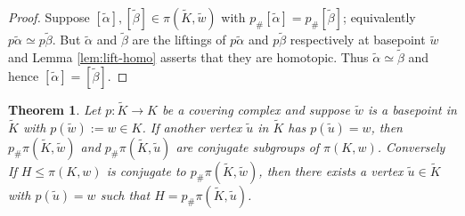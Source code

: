 \documentclass[12pt]{article}
\newtheorem{theorem}{Theorem}
\theoremstyle{definition}
\numberwithin{equation}{theorem}
\begin{document}
\begin{proof}
  Suppose $[\tilde{\alpha}],[\tilde{\beta}] \in \pi(\tilde{K},\tilde{w})$ with $p_{\#}[\tilde{\alpha}] = p_{\#}[\tilde{\beta}]$; equivalently $p\tilde{\alpha} \simeq p\tilde{\beta}$. But $\tilde{\alpha}$ and $\tilde{\beta}$ are the liftings of $p\tilde{\alpha}$ and $p\tilde{\beta}$ respectively at basepoint $\tilde{w}$ and Lemma \ref{lem:lift-homo} asserts that they are homotopic. Thus $\tilde{\alpha} \simeq \tilde{\beta}$ and hence $[\tilde{\alpha}] = [\tilde{\beta}]$.
\end{proof}

\begin{theorem}
  \label{thm:conj}
  Let $p: \tilde{K} \rightarrow K$ be a covering complex and suppose $\tilde{w}$ is a basepoint in $\tilde{K}$ with $p(\tilde{w}) := w \in K$. If another vertex $\tilde{u}$ in $\tilde{K}$ has $p(\tilde{u}) = w$, then $p_{\#}\pi(\tilde{K},\tilde{w})$ and $p_{\#}\pi(\tilde{K},\tilde{u})$ are conjugate subgroups of $\pi(K,w)$. Conversely If $H \leq \pi(K,w)$ is conjugate to $p_{\#}\pi(\tilde{K},\tilde{w})$, then there exists a vertex $\tilde{u} \in \tilde{K}$ with $p(\tilde{u}) = w$ such that $H = p_{\#}\pi(\tilde{K},\tilde{u})$.
\end{theorem}
\end{document}
